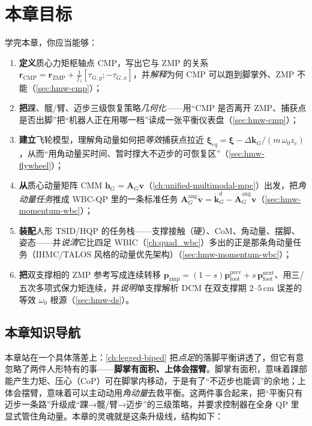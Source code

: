 \section*{本章目标}
学完本章，你应当能够：
\begin{enumerate}
  \item \textbf{定义}质心力矩枢轴点 CMP，写出它与 ZMP 的关系 $\mathbf r_{\mathrm{CMP}}=\mathbf r_{\mathrm{ZMP}}+\frac{1}{f_z}[\tau_{G,y};-\tau_{G,x}]$，并\emph{解释}为何 CMP 可以跑到脚掌外、ZMP 不能（\cref{sec:hmw-cmp}）；
  \item \textbf{把}踝、髋/臂、迈步三级恢复策略\emph{几何化}——用“CMP 是否离开 ZMP、捕获点是否出脚”把“机器人正在用哪一档”读成一张平衡仪表盘（\cref{sec:hmw-cmp}）；
  \item \textbf{建立}飞轮模型，理解角动量如何把\emph{等效}捕获点拉近 $\boldsymbol\xi_{eq}=\boldsymbol\xi-\Delta\mathbf k_G/(m\,\omega_0 z_c)$，从而“用角动量买时间、暂时撑大不迈步的可恢复区”（\cref{sec:hmw-flywheel}）；
  \item \textbf{从}质心动量矩阵 CMM $\mathbf h_G=\mathbf A_G\mathbf v$（\cref{ch:unified-multimodal-mpc}）出发，把\emph{角动量任务}推成 WBC-QP 里的一条标准任务 $\mathbf A_G^{\mathrm{ang}}\dot{\mathbf v}=\dot{\mathbf k}_G^{d}-\dot{\mathbf A}_G^{\mathrm{ang}}\mathbf v$（\cref{sec:hmw-momentum-wbc}）；
  \item \textbf{装配}人形 TSID/HQP 的任务栈——支撑接触（硬）、CoM、角动量、摆脚、姿态——并\emph{说清}它比四足 WBIC（\cref{ch:quad_wbc}）多出的正是那条角动量任务（IHMC/TALOS 风格的动量优先架构）（\cref{sec:hmw-momentum-wbc}）；
  \item \textbf{把}双支撑相的 ZMP 参考写成连续转移 $\mathbf p_{\mathrm{zmp}}=(1-s)\mathbf p_{\mathrm{foot}}^{\mathrm{prev}}+s\,\mathbf p_{\mathrm{foot}}^{\mathrm{next}}$、用三/五次多项式保力矩连续，并\emph{说明}单支撑解析 DCM 在双支撑期 $2$–$5\,\mathrm{cm}$ 误差的等效 $\omega_0$ 根源（\cref{sec:hmw-ds}）。
\end{enumerate}

\subsection*{本章知识导航}
本章站在一个具体落差上：\cref{ch:legged-biped} 把\emph{点足}的落脚平衡讲透了，但它有意忽略了两件人形特有的事——\textbf{脚掌有面积、上体会摆臂}。脚掌有面积，意味着踝部能产生力矩、压心（CoP）可在脚掌内移动，于是有了“不迈步也能调”的余地；上体会摆臂，意味着可以主动动用\emph{角动量}去救平衡。这两件事合起来，把“平衡只有迈步一条路”升级成“踝→髋/臂→迈步”的三级策略，并要求控制器在全身 QP 里显式管住角动量。本章的灵魂就是这条升级线，结构如下：

